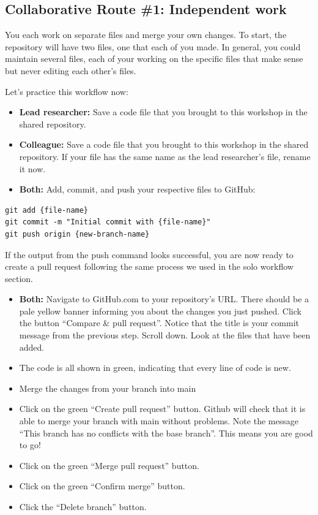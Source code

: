 \documentclass[
]{book}
\providecommand{\tightlist}{%
  \setlength{\itemsep}{0pt}\setlength{\parskip}{0pt}}
\begin{document}
\subsection{Collaborative Route \#1: Independent work}\label{collaborative-route-1-independent-work}

You each work on separate files and merge your own changes. To start, the
repository will have two files, one that each of you made. In general, you could
maintain several files, each of your working on the specific files that make
sense but never editing each other's files.

Let's practice this workflow now:

\begin{itemize}
\tightlist
\item
  \textbf{Lead researcher:} Save a code file that you brought to this workshop in the shared repository.
\item
  \textbf{Colleague:} Save a code file that you brought to this workshop in the shared repository. If
  your file has the same name as the lead researcher's file, rename it now.
\item
  \textbf{Both:} Add, commit, and push your respective files to GitHub:
\end{itemize}

\begin{verbatim}
git add {file-name}
git commit -m "Initial commit with {file-name}"
git push origin {new-branch-name}
\end{verbatim}

If the output from the push command looks successful, you are now ready to create
a pull request following the same process we used in the solo workflow section.

\begin{itemize}
\tightlist
\item
  \textbf{Both:} Navigate to GitHub.com to your repository's URL. There should be a pale yellow
  banner informing you about the changes you just pushed. Click the button
  ``Compare \& pull request''. Notice that the title is your commit message from the
  previous step. Scroll down. Look at the files that have been added.
\item
  The code is all shown in green, indicating that every line of code is new.
\item
  Merge the changes from your branch into main
\item
  Click on the green ``Create pull request'' button. Github will check that it
  is able to merge your branch with main without problems. Note the message ``This
  branch has no conflicts with the base branch''. This means you are good to go!
\item
  Click on the green ``Merge pull request'' button.\\
\item
  Click on the green ``Confirm merge'' button.
\item
  Click the ``Delete branch'' button.
\end{itemize}
\end{document}
